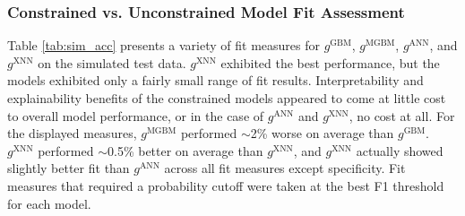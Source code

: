 \documentclass[information,article,accept,moreauthors,pdftex]{Definitions/mdpi}
\begin{document}
{{{\subsubsection{Constrained vs. Unconstrained Model Fit Assessment}\label{ssec:c_v_uc_sim}

Table \ref{tab:sim_acc} presents a variety of fit measures for $g^\text{GBM}$, $g^\text{MGBM}$, $g^\text{ANN}$, and $g^\text{XNN}$ on the simulated test data. $g^\text{XNN}$ exhibited the best performance, but the models exhibited only a fairly small range of fit results. Interpretability and explainability benefits of the constrained models appeared to come at little cost to overall model performance, or in the case of $g^\text{ANN}$ and $g^\text{XNN}$, no cost at all. For the displayed measures, $g^\text{MGBM}$ performed $\sim$2\% worse on average than $g^\text{GBM}$. $g^\text{XNN}$ performed $\sim$0.5\% better on average than $g^\text{XNN}$, and $g^\text{XNN}$ actually showed slightly better fit than $g^\text{ANN}$ across all fit measures except specificity. Fit measures that required a probability cutoff were taken at the best F1 threshold for each model.

}}}
\end{document}
